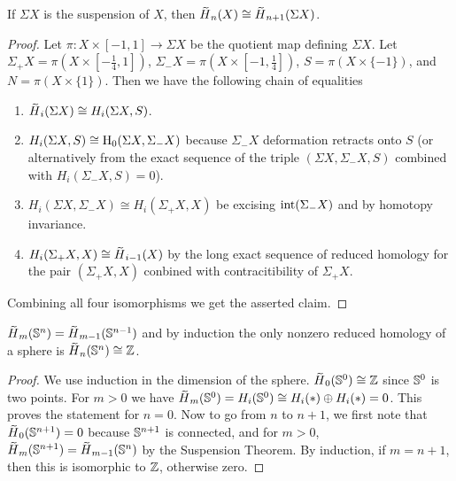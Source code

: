 \begin{cor}
    If $\Sigma X$ is the suspension of $X$, then $\wt{H}_n(X)\cong \wt{H}_{n+1}(\Sigma X)$.
\end{cor}
\begin{proof}
    Let $\pi:X\times [-1,1]\to \Sigma X$ be the quotient map defining $\Sigma X$. Let $\Sigma_+ X=\pi(X\times [-\frac 14,1])$, $\Sigma_-X=\pi(X\times [-1,\frac14])$, $S=\pi(X\times \{-1\})$, and $N=\pi(X\times\{1\})$. Then we have the following chain of equalities
    \begin{enumerate}
        \item $\wt{H}_i(\Sigma X)\cong H_i(\Sigma X,S)$.
        \item $H_i(\Sigma X,S)\cong \mathrm{H}_0(\Sigma X,\Sigma_-X)$ because $\Sigma_-X$ deformation retracts onto $S$ (or alternatively from the exact sequence of the triple $(\Sigma X,\Sigma_- X,S)$ combined with $H_i(\Sigma_-X,S)=0$).
        \item $H_i(\Sigma X,\Sigma_-X)\cong H_i(\Sigma_+X,X)$ be excising $\operatorname{int}(\Sigma_-X)$ and by homotopy invariance.
        \item $H_i(\Sigma_+X,X)\cong \wt{H}_{i-1}(X)$ by the long exact sequence of reduced homology for the pair $(\Sigma_+X,X)$ conbined with contracitibility of $\Sigma_+X$.
    \end{enumerate}
    Combining all four isomorphisms we get the asserted claim.
\end{proof}



\begin{cor}\label{reduced homology of spheres}
    $\wt{H}_m(\bbS^n)=\wt{H}_{m-1}(\bbS^{n-1})$ and by induction the only nonzero reduced homology of a sphere is $\wt{H}_n(\bbS^n)\cong \bbZ$.
\end{cor}
\begin{proof}
     We use induction in the dimension of the sphere. $\wt{H}_0(\bbS^0)\cong\bbZ$ since $\mathbb{S}^0$ is two points. For $m>0$ we have $\wt{H}_m(\bbS^0)=H_i(\bbS^0)\cong H_i(\ast)\oplus H_i(\ast)=0$. This proves the statement for $n=0$. Now to go from $n$ to $n+1$, we first note that $\wt{H}_0(\bbS^{n+1})=0$ because $\mathbb{S}^{n+1}$ is connected, and for $m>0$, $\wt{H}_{m}(\bbS^{n+1})=\wt{H}_{m-1}(\bbS^n)$ by the Suspension Theorem. By induction, if $m=n+1$, then this is isomorphic to $\mathbb{Z}$, otherwise zero.
\end{proof}

